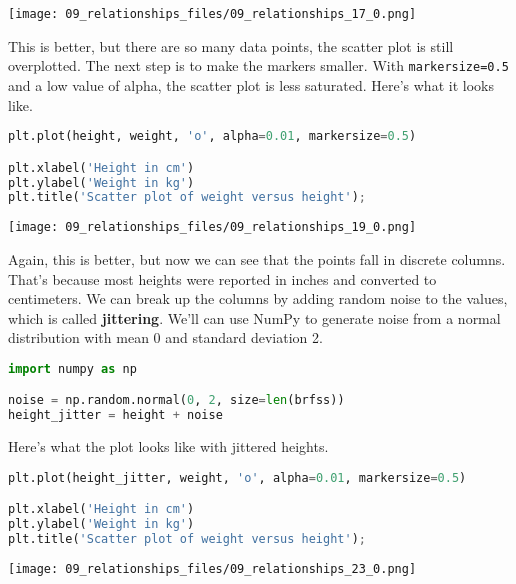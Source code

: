 \begin{center}
\texttt{[image: 09\_relationships\_files/09\_relationships\_17\_0.png]}
\end{center}

This is better, but there are so many data points, the scatter plot is
still overplotted. The next step is to make the markers smaller. With
\passthrough{\lstinline!markersize=0.5!} and a low value of alpha, the
scatter plot is less saturated. Here's what it looks like.

\begin{lstlisting}[language=Python,style=source]
plt.plot(height, weight, 'o', alpha=0.01, markersize=0.5)

plt.xlabel('Height in cm')
plt.ylabel('Weight in kg')
plt.title('Scatter plot of weight versus height');
\end{lstlisting}

\begin{center}
\texttt{[image: 09\_relationships\_files/09\_relationships\_19\_0.png]}
\end{center}

Again, this is better, but now we can see that the points fall in
discrete columns. That's because most heights were reported in inches
and converted to centimeters. We can break up the columns by adding
random noise to the values, which is called \textbf{jittering}. We'll
can use NumPy to generate noise from a normal distribution with mean 0
and standard deviation 2.

\begin{lstlisting}[language=Python,style=source]
import numpy as np

noise = np.random.normal(0, 2, size=len(brfss))
height_jitter = height + noise
\end{lstlisting}

Here's what the plot looks like with jittered heights.

\begin{lstlisting}[language=Python,style=source]
plt.plot(height_jitter, weight, 'o', alpha=0.01, markersize=0.5)

plt.xlabel('Height in cm')
plt.ylabel('Weight in kg')
plt.title('Scatter plot of weight versus height');
\end{lstlisting}

\begin{center}
\texttt{[image: 09\_relationships\_files/09\_relationships\_23\_0.png]}
\end{center}

